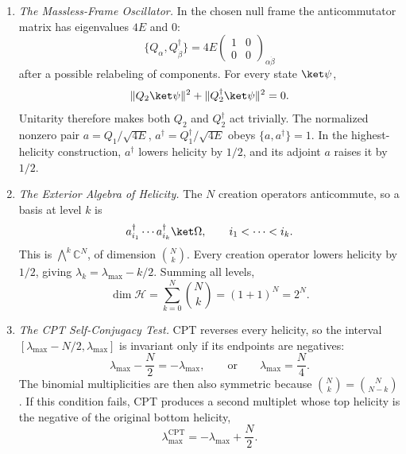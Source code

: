\begin{enumerate}
  \begin{enumerate}
    \item \emph{The Massless-Frame Oscillator.}
    In the chosen null frame the anticommutator matrix has eigenvalues
      \(4E\) and \(0\):
      \[
        \{Q_\alpha,Q^\dagger_{\dot\beta}\}
          =4E\begin{pmatrix}1&0\\0&0\end{pmatrix}_{\alpha\dot\beta}
      \]
      after a possible relabeling of components.  For every state
      \(\ket\psi\),
      \[
        \lVert Q_2\ket\psi\rVert^2+
        \lVert Q_2^\dagger\ket\psi\rVert^2=0.
      \]
      Unitarity therefore makes both \(Q_2\) and \(Q_2^\dagger\) act trivially.
      The normalized nonzero pair
      \(a=Q_1/\sqrt{4E}\), \(a^\dagger=Q_1^\dagger/\sqrt{4E}\)
      obeys \(\{a,a^\dagger\}=1\).  In the highest-helicity construction,
      \(a^\dagger\) lowers helicity by \(1/2\), and its adjoint \(a\) raises it
      by \(1/2\).
    \item \emph{The Exterior Algebra of Helicity.}
    The \(N\) creation operators anticommute, so a basis at level \(k\) is
      \[
        a^\dagger_{i_1}\cdots a^\dagger_{i_k}\ket\Omega,
        \qquad i_1<\cdots<i_k.
      \]
      This is \(\bigwedge^k\mathbb C^N\), of dimension \(\binom Nk\).
      Every creation operator lowers helicity by \(1/2\), giving
      \(\lambda_k=\lambda_{\max}-k/2\).  Summing all levels,
      \[
        \dim\mathcal H=\sum_{k=0}^N\binom Nk=(1+1)^N=2^N.
      \]
    \item \emph{The CPT Self-Conjugacy Test.}
    CPT reverses every helicity, so the interval
      \([\lambda_{\max}-N/2,\lambda_{\max}]\) is invariant only if its endpoints
      are negatives:
      \[
        \lambda_{\max}-\frac N2=-\lambda_{\max},
        \qquad\text{or}\qquad
        \lambda_{\max}=\frac N4.
      \]
      The binomial multiplicities are then also symmetric because
      \(\binom Nk=\binom N{N-k}\).  If this condition fails, CPT produces a
      second multiplet whose top helicity is the negative of the original
      bottom helicity,
      \[
        \lambda_{\max}^{\mathrm{CPT}}
          =-\lambda_{\max}+\frac N2.
      \]
  \end{enumerate}


\end{enumerate}
